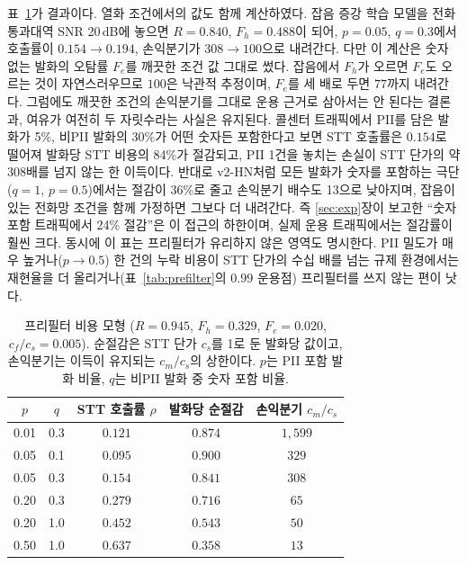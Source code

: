 \documentclass[11pt]{article}
\begin{document}
표~\ref{tab:cost}가 결과이다. 열화 조건에서의 값도 함께 계산하였다. 잡음 증강 학습 모델을
전화 통과대역 SNR 20\,dB에 놓으면 $R=0.840$, $F_h=0.488$이 되어, $p=0.05$, $q=0.3$에서 호출률이
$0.154\to0.194$, 손익분기가 $308\to100$으로 내려간다. 다만 이 계산은 숫자 없는 발화의 오탐률
$F_e$를 깨끗한 조건 값 그대로 썼다. 잡음에서 $F_h$가 오르면 $F_e$도 오르는 것이 자연스러우므로
$100$은 낙관적 추정이며, $F_e$를 세 배로 두면 $77$까지 내려간다. 그럼에도 깨끗한 조건의 손익분기를
그대로 운용 근거로 삼아서는 안 된다는 결론과, 여유가 여전히 두 자릿수라는 사실은 유지된다. 콜센터 트래픽에서 PII를 담은 발화가 5\%, 비PII 발화의 30\%가
어떤 숫자든 포함한다고 보면 STT 호출률은 $0.154$로 떨어져 발화당 STT 비용의 84\%가 절감되고,
PII 1건을 놓치는 손실이 STT 단가의 약 308배를 넘지 않는 한 이득이다. 반대로 v2-HN처럼 모든
발화가 숫자를 포함하는 극단($q=1$, $p=0.5$)에서는 절감이 36\%로 줄고 손익분기 배수도 13으로
낮아지며, 잡음이 있는 전화망 조건을 함께 가정하면 그보다 더 내려간다. 즉 \ref{sec:exp}장이 보고한 ``숫자 포함 트래픽에서 24\% 절감''은 이 접근의 하한이며,
실제 운용 트래픽에서는 절감률이 훨씬 크다. 동시에 이 표는 프리필터가 유리하지 않은 영역도
명시한다. PII 밀도가 매우 높거나($p\!\to\!0.5$) 한 건의 누락 비용이 STT 단가의 수십 배를
넘는 규제 환경에서는 재현율을 더 올리거나(표~\ref{tab:prefilter}의 $0.99$ 운용점) 프리필터를
쓰지 않는 편이 낫다.

\begin{table}[!htbp]
\centering
\caption{프리필터 비용 모형 ($R=0.945$, $F_h=0.329$, $F_e=0.020$, $c_f/c_s=0.005$).
순절감은 STT 단가 $c_s$를 1로 둔 발화당 값이고, 손익분기는 이득이 유지되는
$c_m/c_s$의 상한이다. $p$는 PII 포함 발화 비율, $q$는 비PII 발화 중 숫자 포함 비율.}
\label{tab:cost}
\small
\begin{tabular}{ccccc}
\toprule
$p$ & $q$ & STT 호출률 $\rho$ & 발화당 순절감 & 손익분기 $c_m/c_s$ \\
\midrule
0.01 & 0.3 & $0.121$ & $0.874$ & $1{,}599$ \\
0.05 & 0.1 & $0.095$ & $0.900$ & $329$ \\
0.05 & 0.3 & $0.154$ & $0.841$ & $308$ \\
0.20 & 0.3 & $0.279$ & $0.716$ & $65$ \\
0.20 & 1.0 & $0.452$ & $0.543$ & $50$ \\
0.50 & 1.0 & $0.637$ & $0.358$ & $13$ \\
\bottomrule
\end{tabular}
\end{table}
\end{document}
